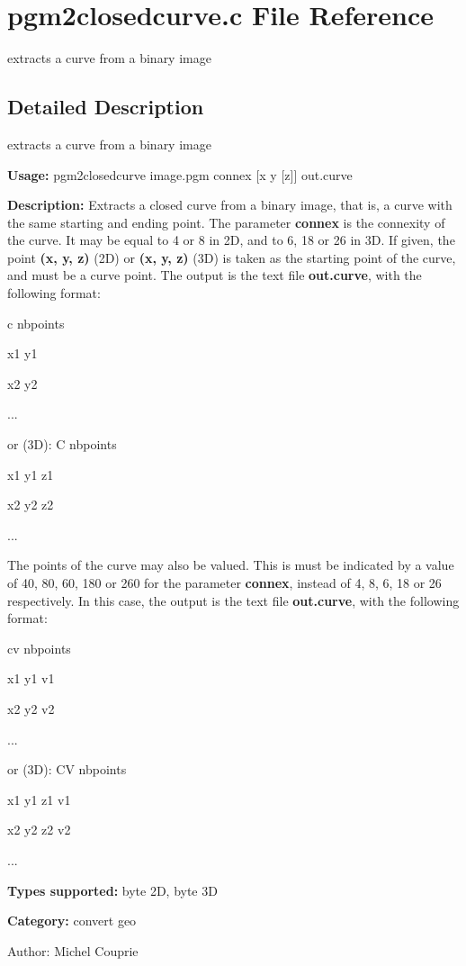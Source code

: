\section{pgm2closedcurve.c File Reference}
\label{pgm2closedcurve_8c}
extracts a curve from a binary image 



\subsection{Detailed Description}
extracts a curve from a binary image 

{\bf Usage:} pgm2closedcurve image.pgm connex [x y [z]] out.curve

{\bf Description:} Extracts a closed curve from a binary image, that is, a curve with the same starting and ending point. The parameter {\bf connex} is the connexity of the curve. It may be equal to 4 or 8 in 2D, and to 6, 18 or 26 in 3D. If given, the point {\bf (x, y, z)} (2D) or {\bf (x, y, z)} (3D) is taken as the starting point of the curve, and must be a curve point. The output is the text file {\bf out.curve}, with the following format:\par
 c nbpoints\par
 x1 y1\par
 x2 y2\par
 ...\par
 or (3D): C nbpoints\par
 x1 y1 z1\par
 x2 y2 z2\par
 ...\par


The points of the curve may also be valued. This is must be indicated by a value of 40, 80, 60, 180 or 260 for the parameter {\bf connex}, instead of 4, 8, 6, 18 or 26 respectively. In this case, the output is the text file {\bf out.curve}, with the following format:\par
 cv nbpoints\par
 x1 y1 v1\par
 x2 y2 v2\par
 ...\par
 or (3D): CV nbpoints\par
 x1 y1 z1 v1\par
 x2 y2 z2 v2\par
 ...\par


{\bf Types supported:} byte 2D, byte 3D

{\bf Category:} convert geo

\begin{Desc}
\item[Author:]Michel Couprie \end{Desc}
